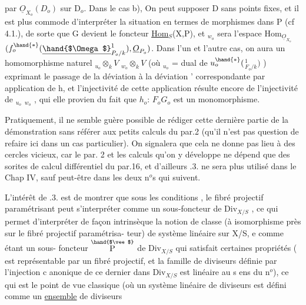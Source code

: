 
par $\underline{O}_{X_o}(D_o)$ sur D$_o$. Dans le cas b), On peut supposer D sans points
fixes, et il est plus commode d'interpréter la situation en termes de
morphismes dans P (cf 4.1.), de sorte que G devient le foncteur
\underline{Hom}$_S$(X,P), et $_{w_o}$ sera l'espace  Hom$_{\underline{O}_{X_o}}$$(f_o^{\hand{*}}(\underline{\hand{$\Omega$}}^{1}_{P_o/k}), \underline{O}_{P_o})$.
Dans l'un et l'autre cas, on aura un homomorphisme naturel
$_{u_o}\otimes_k V$ \hand{$\to$} $_{w_o}\otimes_k V$ (où $_{u_o}$ = dual de $u_o^{\hand{*}}($\hand{$\Omega$}$^{1}_{F_o/k})$ ) exprimant le passage
de la déviation \hand{$\delta$} à la déviation \hand{$\delta$}' correspondante par application de h,
et l'injectivité de cette application résulte encore de l'injectivité
de $_{u_o}$\hand{$\to$} $_{w_o}$ , qui elle provien du fait que $h_o$: $F_o$\hand{$\to$}$G_o$ est un
monomorphisme.
\margin{$/$}

Pratiquement, il ne semble guère possible de rédiger cette dernière
partie de la démonstration sans référer aux petits calculs du par.2
(qu'il n'est pas question de refaire ici dans un cas particulier). On
signalera que cela ne donne pas lieu à des cercles vicieux, car le par.
2  et les calculs qu'on y  développe ne dépend que des sorites
de calcul différentiel du par.16, et d'ailleurs .3. ne sera plus
utilisé dans le Chap IV, sauf peut-être dans les deux n$^{o}$s qui suivent.

L'intérêt de .3. est de montrer que sous les conditions ,
le fibré projectif paramétrisant peut s'interpréter comme un sous-foncteur
de Div$_{X/S}$ , ce qui permet d'interpréter de façon intrinsèque la notion
de classe (à isomorphisme près sur le  fibré projectif paramétrisa-%
teur) de système linéaire sur X/S, e comme étant un sous-
foncteur $\overset{\hand{$\vee$}}{\text{P}}$ de Div$_{X/S}$ qui satisfait certaines propriétés ( est
représentable par un fibré projectif, et la famille de diviseurs définie
par l'injection c anonique de ce dernier dans Div$_{X/S}$ est linéaire au s ens
du n$^{o}$), ce qui est  le point de vue classique (où un
système linéaire de diviseurs est défini comme un \uline{ensemble} de diviseurs

